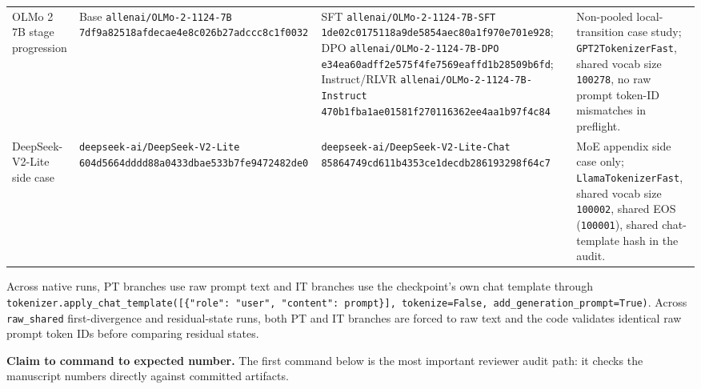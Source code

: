 \documentclass[11pt]{article}
\begin{document}
\begin{table}[t]
\begin{tabularx}{\linewidth}{@{}>{\raggedright\arraybackslash}X >{\raggedright\arraybackslash}X >{\raggedright\arraybackslash}X >{\raggedright\arraybackslash}X@{}}
OLMo 2 7B stage progression & Base \texttt{allenai/OLMo-2-1124-7B} \texttt{7df9a82518afdecae4e8c026b27adccc8c1f0032} & SFT \texttt{allenai/OLMo-2-1124-7B-SFT} \texttt{1de02c0175118a9de5854aec80a1f970e701e928}; DPO \texttt{allenai/OLMo-2-1124-7B-DPO} \texttt{e34ea60adff2e575f4fe7569eaffd1b28509b6fd}; Instruct/RLVR \texttt{allenai/OLMo-2-1124-7B-Instruct} \texttt{470b1fba1ae01581f270116362ee4aa1b97f4c84} & Non-pooled local-transition case study; \texttt{GPT2TokenizerFast}, shared vocab size \texttt{100278}, no raw prompt token-ID mismatches in preflight. \\
DeepSeek-V2-Lite side case & \texttt{deepseek-ai/DeepSeek-V2-Lite} \texttt{604d5664dddd88a0433dbae533b7fe9472482de0} & \texttt{deepseek-ai/DeepSeek-V2-Lite-Chat} \texttt{85864749cd611b4353ce1decdb286193298f64c7} & MoE appendix side case only; \texttt{LlamaTokenizerFast}, shared vocab size \texttt{100002}, shared EOS (\texttt{100001}), shared chat-template hash in the audit. \\
\bottomrule
\end{tabularx}
\end{table}

Across native runs, PT branches use raw prompt text and IT branches use the checkpoint's own chat template through \texttt{tokenizer.apply\_chat\_template([\{"role": "user", "content": prompt\}], tokenize=False, add\_generation\_prompt=True)}. Across \texttt{raw\_shared} first-divergence and residual-state runs, both PT and IT branches are forced to raw text and the code validates identical raw prompt token IDs before comparing residual states.

\textbf{Claim to command to expected number.} The first command below is the most important reviewer audit path: it checks the manuscript numbers directly against committed artifacts.
\end{document}
